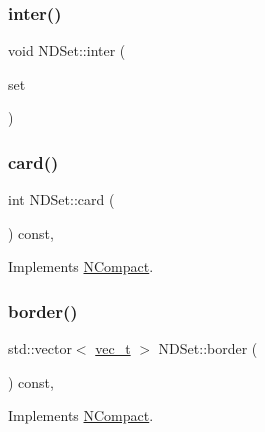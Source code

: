 \mbox{\label{class_n_d_set_abf13bbb9169af9e4b507fc8fcfb83232}} 
\subsubsection{\texorpdfstring{inter()}{inter()}}
{\footnotesize\ttfamily void N\+D\+Set\+::inter (\begin{DoxyParamCaption}\item[{const \mbox{\hyperlink{class_n_d_set}{N\+D\+Set}} \&}]{set }\end{DoxyParamCaption})}

\mbox{\label{class_n_d_set_a683386499ad6a9de65e0197f2846d8de}} 
\subsubsection{\texorpdfstring{card()}{card()}}
{\footnotesize\ttfamily int N\+D\+Set\+::card (\begin{DoxyParamCaption}{ }\end{DoxyParamCaption}) const\hspace{0.3cm}{\ttfamily [override]}, {\ttfamily [virtual]}}



Implements \mbox{\hyperlink{class_n_compact_a816bb4976567a7bfed57763ce717b685}{N\+Compact}}.

\mbox{\label{class_n_d_set_a3020476b78835439f6474845d30f00ff}} 
\subsubsection{\texorpdfstring{border()}{border()}}
{\footnotesize\ttfamily std\+::vector$<$ \mbox{\hyperlink{_n_vector_8h_a0a2cfc67e738a3d73e4f12098c4c07f6}{vec\+\_\+t}} $>$ N\+D\+Set\+::border (\begin{DoxyParamCaption}{ }\end{DoxyParamCaption}) const\hspace{0.3cm}{\ttfamily [override]}, {\ttfamily [virtual]}}



Implements \mbox{\hyperlink{class_n_compact_af7acc50099e80fc13ce32c97e6857308}{N\+Compact}}.


